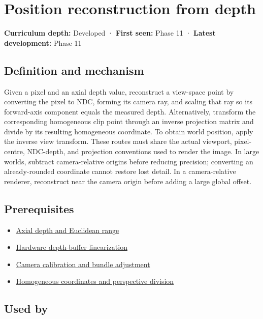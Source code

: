 \hypertarget{appendix-2cbf2968e866}{}\label{referencestart:appendix-2cbf2968e866}
\section{Position reconstruction from depth}\label{appendix-2cbf2968e866-position-reconstruction-from-depth}

\textbf{Curriculum depth:} Developed · \textbf{First seen:} Phase 11 · \textbf{Latest development:} Phase 11

\subsection{Definition and mechanism}\label{appendix-2cbf2968e866-definition-and-mechanism}

Given a pixel and an axial depth value, reconstruct a view-space point by converting the pixel to NDC, forming its camera ray, and scaling that ray so its forward-axis component equals the measured depth. Alternatively, transform the corresponding homogeneous clip point through an inverse projection matrix and divide by its resulting homogeneous coordinate. To obtain world position, apply the inverse view transform. These routes must share the actual viewport, pixel-centre, NDC-depth, and projection conventions used to render the image. In large worlds, subtract camera-relative origins before reducing precision; converting an already-rounded coordinate cannot restore lost detail. In a camera-relative renderer, reconstruct near the camera origin before adding a large global offset.

\subsection{Prerequisites}\label{appendix-2cbf2968e866-prerequisites}

\begin{itemize}
\tightlist
\item
  \hyperref[appendix-cac01ebeeb11]{Axial depth and Euclidean range}
\item
  \hyperref[appendix-1bc40b08db4a]{Hardware depth-buffer linearization}
\item
  \hyperref[appendix-3ee9861904d5]{Camera calibration and bundle adjustment}
\item
  \hyperref[appendix-cb3b26862282]{Homogeneous coordinates and perspective division}
\end{itemize}

\subsection{Used by}\label{appendix-2cbf2968e866-used-by}

